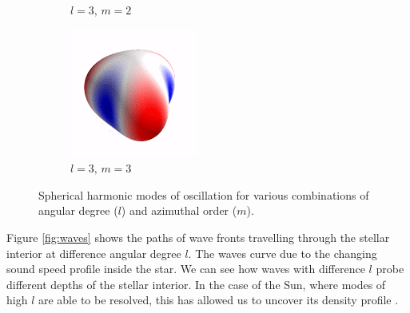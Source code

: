 \begin{figure}[ht]
\begin{subfigure}[b]{0.2\linewidth}
        \caption*{$l=3,\,m=2$}
    \end{subfigure}%
    \begin{subfigure}[b]{0.2\linewidth}
        \includegraphics[width=\linewidth]{introduction/images/3_3.png}
        \caption*{$l=3,\,m=3$}
    \end{subfigure}
    \caption{Spherical harmonic modes of oscillation for various combinations of angular degree ($l$) and azimuthal order ($m$).}
    \label{fig:modes}
\end{figure}

Figure \ref{fig:waves} shows the paths of wave fronts travelling through the stellar interior at difference angular degree $l$. The waves curve due to the changing sound speed profile inside the star. We can see how waves with difference $l$ probe different depths of the stellar interior. In the case of the Sun, where modes of high $l$ are able to be resolved, this has allowed us to uncover its density profile \citep{}.

